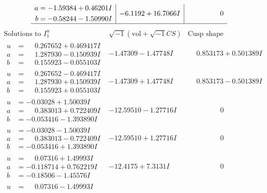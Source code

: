 \documentclass[1p]{elsarticle_modified}
\theoremstyle{definition}
\newcommand{\I}{\sqrt{-1}}
\begin{document}
$$\begin{array}{c|c|c}
\begin{aligned}
a &= -1.59384 + 0.46201 I \\
b &= -0.58244 - 1.50990 I\end{aligned}
 & -6.1192 + 16.7066 I & \phantom{-0.000000 } 0\\
 \hline 
 \end{array}$$\newpage$$\begin{array}{c|c|c}  
\text{Solutions to }I^u_{1}& \I (\text{vol} + \sqrt{-1}CS) & \text{Cusp shape}\\
 \hline 
\begin{aligned}
u &= \phantom{-}0.267652 + 0.469417 I \\
a &= \phantom{-}1.287930 - 0.150939 I \\
b &= \phantom{-}0.155923 - 0.055103 I\end{aligned}
 & -1.47309 - 1.47748 I & \phantom{-}0.853173 + 0.501389 I \\ \hline\begin{aligned}
u &= \phantom{-}0.267652 - 0.469417 I \\
a &= \phantom{-}1.287930 + 0.150939 I \\
b &= \phantom{-}0.155923 + 0.055103 I\end{aligned}
 & -1.47309 + 1.47748 I & \phantom{-}0.853173 - 0.501389 I \\ \hline\begin{aligned}
u &= -0.03028 + 1.50039 I \\
a &= \phantom{-}0.383013 + 0.722409 I \\
b &= -0.053416 - 1.393890 I\end{aligned}
 & -12.59510 - 1.27716 I & \phantom{-0.000000 } 0 \\ \hline\begin{aligned}
u &= -0.03028 - 1.50039 I \\
a &= \phantom{-}0.383013 - 0.722409 I \\
b &= -0.053416 + 1.393890 I\end{aligned}
 & -12.59510 + 1.27716 I & \phantom{-0.000000 } 0 \\ \hline\begin{aligned}
u &= \phantom{-}0.07316 + 1.49993 I \\
a &= -0.118714 + 0.762219 I \\
b &= -0.18506 - 1.45576 I\end{aligned}
 & -12.4175 + 7.3131 I & \phantom{-0.000000 } 0 \\ \hline\begin{aligned}
u &= \phantom{-}0.07316 - 1.49993 I \\

\end{aligned}
\end{array}$$
\end{document}
